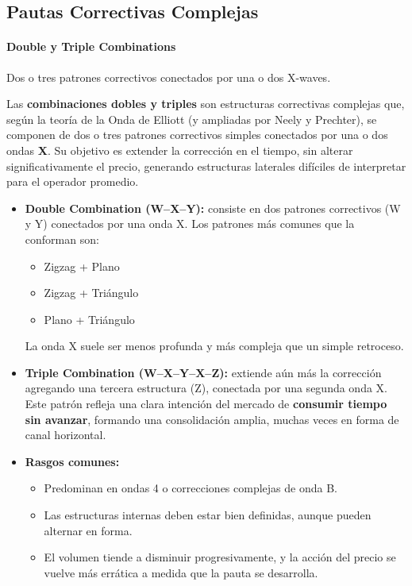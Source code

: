 \subsection{Pautas Correctivas Complejas}

\paragraph{Double y Triple Combinations~\cite{Elliottwave}}
Dos o tres patrones correctivos conectados por una o dos X-waves.

Las \textbf{combinaciones dobles y triples} son estructuras correctivas complejas que, seg\'un la teor\'ia de la Onda de Elliott (y ampliadas por Neely y Prechter), se componen de dos o tres patrones correctivos simples conectados por una o dos ondas \textbf{X}. Su objetivo es extender la correcci\'on en el tiempo, sin alterar significativamente el precio, generando estructuras laterales dif\'iciles de interpretar para el operador promedio.

\begin{itemize}
    \item \textbf{Double Combination (W--X--Y):} consiste en dos patrones correctivos (W y Y) conectados por una onda X. Los patrones m\'as comunes que la conforman son:
    \begin{itemize}
        \item Zigzag + Plano
        \item Zigzag + Tri\'angulo
        \item Plano + Tri\'angulo
    \end{itemize}
    La onda X suele ser menos profunda y m\'as compleja que un simple retroceso.

    \item \textbf{Triple Combination (W--X--Y--X--Z):} extiende a\'un m\'as la correcci\'on agregando una tercera estructura (Z), conectada por una segunda onda X. Este patr\'on refleja una clara intenci\'on del mercado de \textbf{consumir tiempo sin avanzar}, formando una consolidaci\'on amplia, muchas veces en forma de canal horizontal.

    \item \textbf{Rasgos comunes:}
    \begin{itemize}
        \item Predominan en ondas 4 o correcciones complejas de onda B.
        \item Las estructuras internas deben estar bien definidas, aunque pueden alternar en forma.
        \item El volumen tiende a disminuir progresivamente, y la acci\'on del precio se vuelve m\'as err\'atica a medida que la pauta se desarrolla.
    \end{itemize}
\end{itemize}

